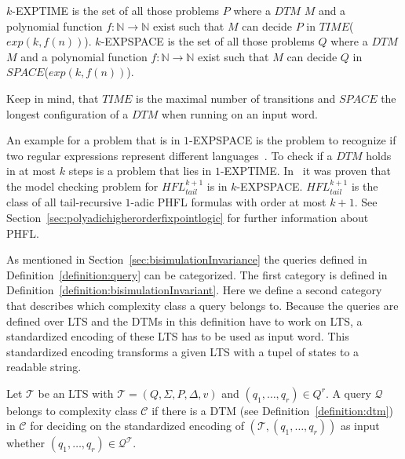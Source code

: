 \begin{definition}
    \label{definition:k_exptime_and_k_expspace}
    $k$-EXPTIME is the set of all those problems $P$ where a $\mathit{DTM}$ $M$ and a polynomial function $f: \mathbb{N}
    \rightarrow \mathbb{N}$ exist such that $M$ can decide $P$ in $\mathit{TIME}$($exp(k, f(n))$).
    $k$-EXPSPACE is the set of all those problems $Q$ where a $\mathit{DTM}$ $M$ and a polynomial function $f: \mathbb{N}
    \rightarrow \mathbb{N}$ exist such that $M$ can decide $Q$ in $\mathit{SPACE}$($exp(k, f(n))$).
\end{definition}

Keep in mind, that $\mathit{TIME}$ is the maximal number of transitions and $\mathit{SPACE}$ the longest configuration of a
$\mathit{DTM}$ when running on an input word.

An example for a problem that is in $1$-EXPSPACE is the problem to recognize
if two regular expressions represent different languages~\cite{meyer1972equivalence}. To check if a $\mathit{DTM}$
holds in at most $k$ steps is a problem that lies in $1$-EXPTIME. In~\cite{bruse2017space} it was proven that the
model checking problem for $\mathit{HFL}^{k + 1}_{tail}$ is in $k$-EXPSPACE. $\mathit{HFL}^{k + 1}_{tail}$ is the
class of all tail-recursive $1$-adic PHFL formulas with order at most $k + 1$. See
Section~\ref{sec:polyadichigherorderfixpointlogic} for further information about PHFL.

As mentioned in Section~\ref{sec:bisimulationInvariance} the queries defined in Definition~\ref{definition:query} can be categorized. The first category is defined in Definition~\ref{definition:bisimulationInvariant}. Here we define a second category that describes which complexity class a query belongs to. Because the queries are defined over LTS and the DTMs in this definition have to work on LTS, a standardized encoding of these LTS has to be used as input word. This standardized encoding transforms a given LTS with a tupel of states to a readable string.

\begin{definition}
    \label{definition:queryBelongsToComplexityClass}
    Let $\mathcal{T}$ be an LTS with $\mathcal{T} = (Q, \Sigma, P, \Delta, v)$ and $(q_1, \dots, q_{r}) \in Q^r$.
    A query $\mathcal{Q}$ belongs to complexity class $\mathcal{C}$ if there is a DTM (see
    Definition~\ref{definition:dtm}) in $\mathcal{C}$ for deciding on the standardized encoding of $(\mathcal{T}, (q_1, \dots,
    q_{r}))$ as input whether $(q_1, \dots, q_{r}) \in \mathcal{Q}^\mathcal{T}$.
\end{definition}

